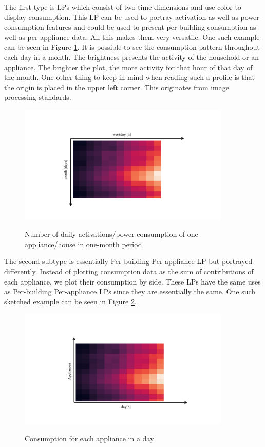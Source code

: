 The first type is LPs which consist of two-time dimensions and use color to display consumption.
This LP can be used to portray activation as well as power consumption features and could be used to present per-building consumption as well as per-appliance data.
All this makes them very versatile.
One such example can be seen in Figure \ref{fig:heatmap_2dtime}. 
It is possible to see the consumption pattern throughout each day in a month.
The brightness presents the activity of the household or an appliance. 
The brighter the plot, the more activity for that hour of that day of the month.
One other thing to keep in mind when reading such a profile is that the origin is placed in the upper left corner.
This originates from image processing standards.

\begin{figure}[H]
	\centering
	\caption{Number of daily activations/power consumption of one appliance/house in one-month period}
	\includegraphics[width=0.9\textwidth]{Figures/profile_sketches/Slide10.png}
	\label{fig:heatmap_2dtime}
\end{figure}

The second subtype is essentially Per-building Per-appliance LP but portrayed differently.
Instead of plotting consumption data as the sum of contributions of each appliance, we plot their consumption by side.
These LPs have the same uses as Per-building Per-appliance LPs since they are essentially the same.
One such sketched example can be seen in Figure \ref{fig:heatmap_all_appl}.

\begin{figure}[H]
	\centering
	\caption{Consumption for each appliance in a day}
	\includegraphics[width=0.9\textwidth]{Figures/profile_sketches/Slide12.png}
	\label{fig:heatmap_all_appl}
\end{figure}

